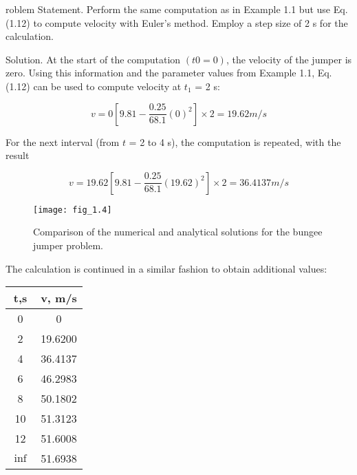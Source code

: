 \documentclass[../main.tex]{subfiles}
\begin{document}
roblem Statement. Perform the same computation as in Example 1.1 but use Eq. (1.12)
to compute velocity with Euler's method. Employ a step size of 2 s for the calculation.

Solution. At the start of the computation $(t0 = 0)$, the velocity of the jumper is zero.
Using this information and the parameter values from Example 1.1, Eq. (1.12) can be used
to compute velocity at $t_1$ = 2 s:

$$ v= 0 \left[ 9.81 - \dfrac{0.25}{68.1}(0)^2 \right] \times 2 = 19.62 m/s$$ 

For the next interval (from $t$ = 2 to 4 s), the computation is repeated, with the result

$$ v= 19.62 \left[ 9.81 - \dfrac{0.25}{68.1}(19.62)^2 \right] \times 2 = 36.4137 m/s$$ 

\begin{figure}[H]
	\centering
	\texttt{[image: fig\_1.4]}
   \caption{\textsf{Comparison of the numerical and analytical solutions for the bungee jumper problem.}}
   \label{fig_1.4}
\end{figure}


The calculation is continued in a similar fashion to obtain additional values:


\begin{table}[H]
	\begin{tabular}{c c}
		\hline
		\textbf{t,s} & \textbf{v, m/s} \\ 
		\hline
			0 &0\\
			2 &19.6200\\
			4 &36.4137\\
			6& 46.2983\\
			8 &50.1802\\
			10 & 51.3123\\
			12& 51.6008\\
			$\inf$ &51.6938 \\
			\hline
		
	\end{tabular}
\end{table}
\end{document}

